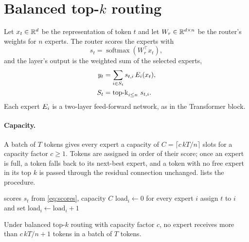 \section{Balanced top-$k$ routing}
\label{sec:method}

Let $x_t \in \mathbb{R}^d$ be the representation of token $t$ and let $W_r \in \mathbb{R}^{d \times n}$ be the router's weights for $n$ experts.
The router scores the experts with
\begin{equation}
  s_t = \operatorname{softmax}(W_r^\top x_t),
  \label{eq:scores}
\end{equation}
and the layer's output is the weighted sum of the selected experts,
\begin{align}
  y_t &= \sum_{i \in S_t} s_{t,i}\, E_{i}(x_t), \label{eq:output}\\
  S_t &= \operatorname{top\text{-}k}_{i \le n} \, s_{t,i}. \nonumber
\end{align}
Each expert $E_{i}$ is a two-layer feed-forward network, as in the Transformer block.

\paragraph{Capacity.}
A batch of $T$ tokens gives every expert a capacity of $C = \lceil c\,kT/n \rceil$ slots for a capacity factor $c \ge 1$.
Tokens are assigned in order of their score; once an expert is full, a token falls back to its next-best expert, and a token with no free expert in its top $k$ is passed through the residual connection unchanged.
 lists the procedure.

\begin{algorithm}[t]
  \caption{Balanced top-$k$ routing for one batch.}
  \label{alg:router}
  \begin{algorithmic}[1]
    \Require scores $s_t$ from \cref{eq:scores}, capacity $C$
    \State $\mathrm{load}_i \gets 0$ for every expert $i$
          \State assign $t$ to $i$ and set $\mathrm{load}_i \gets \mathrm{load}_i + 1$
        \EndIf
      \EndFor
    \EndFor
  \end{algorithmic}
\end{algorithm}

\begin{proposition}
\label{prop:load}
Under balanced top-$k$ routing with capacity factor $c$, no expert receives more than $c\,kT/n + 1$ tokens in a batch of $T$ tokens.
\end{proposition}

